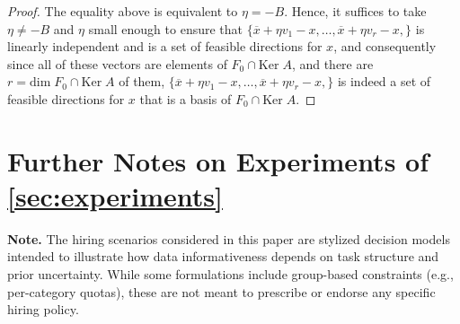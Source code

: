 \documentclass[11pt]{article}
\theoremstyle{plain}
\theoremstyle{definition}
\newcommand{\Ker}[0]{\mathrm{Ker}\;}
\renewcommand{\dim}[0]{\mathrm{dim}\;}
\begin{document}
\begin{proof}
        \vspace{5mm}
        
        The equality above is equivalent to $\eta = -B$. Hence, it suffices to take $\eta\neq -B$ and $\eta$ small enough to ensure that $\{\overline{x}+\eta v_1 - x,\dots,\overline{x}+\eta v_r - x,\}$ is linearly independent and is a set of feasible directions for $x$, and consequently since all of these vectors are elements of $F_0 \cap \Ker A$, and there are $r=\dim F_0 \cap \Ker A$ of them, $\{\overline{x}+\eta v_1 - x,\dots,\overline{x}+\eta v_r - x,\}$ is indeed a set of feasible directions for $x$ that is a basis of $F_0\cap \Ker A$.
        \end{proof}
 
\section{Further Notes on Experiments of \cref{sec:experiments}} \label{appendix: additional notes on experiments}

\textbf{Note.}
The hiring scenarios considered in this paper are stylized decision models intended to illustrate how data informativeness depends on task structure and prior uncertainty. While some formulations include group-based constraints (e.g., per-category quotas), these are not meant to prescribe or endorse any specific hiring policy. 


        
\end{document}
